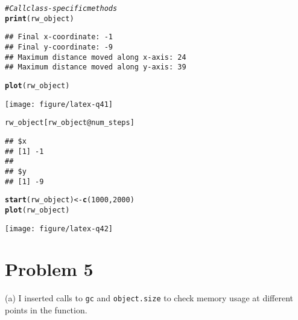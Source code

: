 \documentclass{article}\usepackage[]{graphicx}\usepackage[]{color}
\makeatletter
\def\maxwidth{ %
  \ifdim\Gin@nat@width>\linewidth
    \linewidth
  \else
    \Gin@nat@width
  \fi
}
\newcommand{\hlnum}[1]{\textcolor[rgb]{0.686,0.059,0.569}{#1}}%
\newcommand{\hlcom}[1]{\textcolor[rgb]{0.678,0.584,0.686}{\textit{#1}}}%
\newcommand{\hlopt}[1]{\textcolor[rgb]{0,0,0}{#1}}%
\newcommand{\hlstd}[1]{\textcolor[rgb]{0.345,0.345,0.345}{#1}}%
\newcommand{\hlkwb}[1]{\textcolor[rgb]{0.69,0.353,0.396}{#1}}%
\newcommand{\hlkwc}[1]{\textcolor[rgb]{0.333,0.667,0.333}{#1}}%
\newcommand{\hlkwd}[1]{\textcolor[rgb]{0.737,0.353,0.396}{\textbf{#1}}}%
\newenvironment{kframe}{%
 \def\at@end@of@kframe{}%
 \ifinner\ifhmode%
  \def\at@end@of@kframe{\end{minipage}}%
  \begin{minipage}{\columnwidth}%
 \fi\fi%
 \def\FrameCommand##1{\hskip\@totalleftmargin \hskip-\fboxsep
 \colorbox{shadecolor}{##1}\hskip-\fboxsep
     \hskip-\linewidth \hskip-\@totalleftmargin \hskip\columnwidth}%
 \MakeFramed {\advance\hsize-\width
   \@totalleftmargin\z@ \linewidth\hsize
   \@setminipage}}%
 {\par\unskip\endMakeFramed%
 \at@end@of@kframe}
\newenvironment{knitrout}{}{} %
\makeatother
\begin{document}
\begin{knitrout}
\begin{kframe}
\begin{alltt}
 \hlcom{# Call class-specific methods}
 \hlkwd{print}\hlstd{(rw_object)}
\end{alltt}
\begin{verbatim}
## Final x-coordinate: -1
## Final y-coordinate: -9
## Maximum distance moved along x-axis: 24
## Maximum distance moved along y-axis: 39
\end{verbatim}
\begin{alltt}
 \hlkwd{plot}\hlstd{(rw_object)}
\end{alltt}
\end{kframe}
\texttt{[image: figure/latex-q41]} 
\begin{kframe}\begin{alltt}
 \hlstd{rw_object[rw_object}\hlopt{@}\hlkwc{num_steps}\hlstd{]}
\end{alltt}
\begin{verbatim}
## $x
## [1] -1
## 
## $y
## [1] -9
\end{verbatim}
\begin{alltt}
 \hlkwd{start}\hlstd{(rw_object)} \hlkwb{<-} \hlkwd{c}\hlstd{(}\hlnum{1000}\hlstd{,} \hlnum{2000}\hlstd{)}
 \hlkwd{plot}\hlstd{(rw_object)}
\end{alltt}
\end{kframe}
\texttt{[image: figure/latex-q42]} 

\end{knitrout}
\section{Problem 5}
(a) I inserted calls to \texttt{gc} and  \texttt{object.size} to check memory usage at different points in the function.
\end{document}
